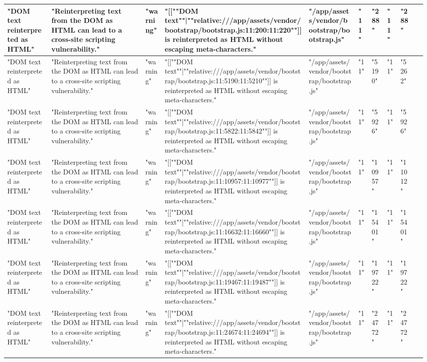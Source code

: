 \begin{table}[H]
\begin{tabular}{|l|l|l|l|l|l|l|l|l|l|}
      "DOM text reinterpreted as HTML" & "Reinterpreting text from the DOM as HTML can lead to a cross-site scripting vulnerability." & "warning" & "[[""DOM text""|""relative:///app/assets/vendor/bootstrap/bootstrap.js:11:200:11:220""]] is reinterpreted as HTML without escaping meta-characters." & "/app/assets/vendor/bootstrap/bootstrap.js" & "11" & "288" & "11" & "288" & ~ \\ \hline
      "DOM text reinterpreted as HTML" & "Reinterpreting text from the DOM as HTML can lead to a cross-site scripting vulnerability." & "warning" & "[[""DOM text""|""relative:///app/assets/vendor/bootstrap/bootstrap.js:11:5190:11:5210""]] is reinterpreted as HTML without escaping meta-characters." & "/app/assets/vendor/bootstrap/bootstrap.js" & "11" & "5190" & "11" & "5262" & ~ \\ \hline
      "DOM text reinterpreted as HTML" & "Reinterpreting text from the DOM as HTML can lead to a cross-site scripting vulnerability." & "warning" & "[[""DOM text""|""relative:///app/assets/vendor/bootstrap/bootstrap.js:11:5822:11:5842""]] is reinterpreted as HTML without escaping meta-characters." & "/app/assets/vendor/bootstrap/bootstrap.js" & "11" & "5926" & "11" & "5926" & ~ \\ \hline
      "DOM text reinterpreted as HTML" & "Reinterpreting text from the DOM as HTML can lead to a cross-site scripting vulnerability." & "warning" & "[[""DOM text""|""relative:///app/assets/vendor/bootstrap/bootstrap.js:11:10957:11:10977""]] is reinterpreted as HTML without escaping meta-characters." & "/app/assets/vendor/bootstrap/bootstrap.js" & "11" & "10957" & "11" & "11012" & ~ \\ \hline
      "DOM text reinterpreted as HTML" & "Reinterpreting text from the DOM as HTML can lead to a cross-site scripting vulnerability." & "warning" & "[[""DOM text""|""relative:///app/assets/vendor/bootstrap/bootstrap.js:11:16632:11:16660""]] is reinterpreted as HTML without escaping meta-characters." & "/app/assets/vendor/bootstrap/bootstrap.js" & "11" & "15401" & "11" & "15401" & ~ \\ \hline
      "DOM text reinterpreted as HTML" & "Reinterpreting text from the DOM as HTML can lead to a cross-site scripting vulnerability." & "warning" & "[[""DOM text""|""relative:///app/assets/vendor/bootstrap/bootstrap.js:11:19467:11:19487""]] is reinterpreted as HTML without escaping meta-characters." & "/app/assets/vendor/bootstrap/bootstrap.js" & "11" & "19722" & "11" & "19722" & ~ \\ \hline
      "DOM text reinterpreted as HTML" & "Reinterpreting text from the DOM as HTML can lead to a cross-site scripting vulnerability." & "warning" & "[[""DOM text""|""relative:///app/assets/vendor/bootstrap/bootstrap.js:11:24674:11:24694""]] is reinterpreted as HTML without escaping meta-characters." & "/app/assets/vendor/bootstrap/bootstrap.js" & "11" & "24772" & "11" & "24772" & ~ \\ \hline

\end{tabular}
\end{table}
